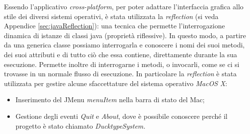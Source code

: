 Essendo l'applicativo \emph{cross-platform}, per poter adattare l'interfaccia grafica
allo stile dei diversi sistemi operativi, è stata utilizzata la \emph{reflection} (si veda Appendice \ref{sec:javaReflection}):
una tecnica che permette l’interrogazione dinamica di istanze di classi java
(proprietà riflessive). In questo modo, a partire da una generica classe possiamo
interrogarla e conoscere i nomi dei suoi metodi, dei suoi attributi e di tutto ciò
che essa contiene, direttamente durante la sua esecuzione. Permette inoltre
 di interrogarne i metodi, o invocarli, come se ci si trovasse in un normale flusso di esecuzione.
In particolare la \emph{reflection} è stata utilizzata per gestire alcune sfaccettature del sistema operativo
\emph{MacOS X}: 
\begin{itemize}
	\item Inserimento del JMenu \emph{menuItem} nella barra di stato del Mac;
	\item Gestione degli eventi \emph{Quit} e \emph{About}, dove è possibile conoscere
	perché il progetto è stato chiamato \emph{DucktypeSystem.}
\end{itemize}
